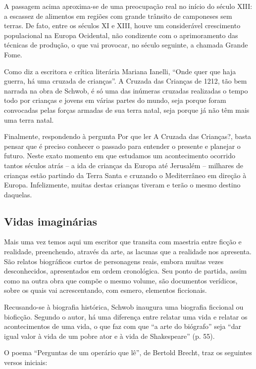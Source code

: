 \documentclass[12pt]{extarticle}
\begin{document}
A passagem acima aproxima-se de uma preocupação real no início do século
XIII: a escassez de alimentos em regiões com grande trânsito de
camponeses sem terras. De fato, entre os séculos XI e XIII, houve um
considerável crescimento populacional na Europa Ocidental, não
condizente com o aprimoramento das técnicas de produção, o que vai
provocar, no século seguinte, a chamada Grande Fome.

Como diz a escritora e crítica literária Mariana Ianelli, ``Onde quer
que haja guerra, há uma cruzada de crianças''. A Cruzada das Crianças
de 1212, tão bem narrada na obra de Schwob, é só uma das inúmeras
cruzadas realizadas o tempo todo por crianças e jovens em várias partes
do mundo, seja porque foram convocadas pelas forças armadas de sua terra
natal, seja porque já não têm mais uma terra natal.

Finalmente, respondendo à pergunta Por que ler A Cruzada das Crianças?,
basta pensar que é preciso conhecer o passado para entender o presente e
planejar o futuro. Neste exato momento em que estudamos um acontecimento
ocorrido tantos séculos atrás -- a ida de crianças da Europa até
Jerusalém -- milhares de crianças estão partindo da Terra Santa e
cruzando o Mediterrâneo em direção à Europa. Infelizmente, muitas destas
crianças tiveram e terão o mesmo destino daquelas.

\subsection{Vidas imaginárias}

Mais uma vez temos aqui um escritor que transita com maestria entre
ficção e realidade, preenchendo, através da arte, as lacunas que a
realidade nos apresenta. São relatos biográficos curtos de personagens
reais, embora muitas vezes desconhecidos, apresentados em ordem
cronológica. Seu ponto de partida, assim como na outra obra que compõe o
mesmo volume, são documentos verídicos, sobre os quais vai
acrescentando, com esmero, elementos ficcionais.

Recusando-se à biografia histórica, Schwob inaugura uma biografia
ficcional ou bioficção. Segundo o autor, há uma diferença entre relatar
uma vida e relatar os acontecimentos de uma vida, o que faz com que ``a
arte do biógrafo'' seja ``dar igual valor à vida de um pobre ator e à
vida de Shakespeare'' (p. 55).

O poema ``Perguntas de um operário que lê'', de Bertold Brecht, traz os
seguintes versos iniciais:
\end{document}
